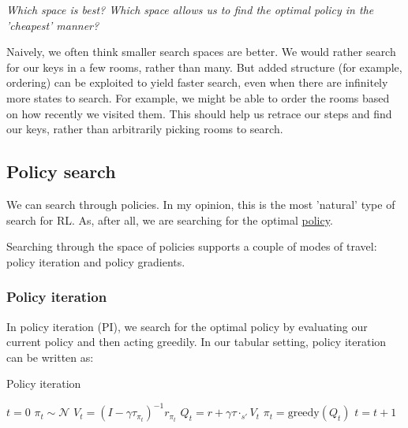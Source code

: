 \begin{displayquote}
  \textsl{Which space is best? Which space allows us to find the optimal policy in the 'cheapest' manner?}
\end{displayquote}

Naively, we often think smaller search spaces are better. We would rather
search for our keys in a few rooms, rather than many. But added
structure (for example, ordering) can be exploited to yield faster
search, even when there are infinitely more states to search. For example,
we might be able to order the rooms based on how recently we visited them.
This should help us retrace our steps and find our keys, rather than arbitrarily
picking rooms to search.

\subsection{Policy search}

We can search through policies. In my opinion, this is the most 'natural' type of search for RL.
As, after all, we are searching for the optimal \underline{policy}.

Searching through the space of policies supports a couple of modes of travel:
policy iteration and policy gradients.

\subsubsection{Policy iteration}

In policy iteration (PI), we search for the optimal policy by evaluating our current
policy and then acting greedily. In our tabular setting, policy iteration can be written as:

\begin{algorithm}[H]
\caption{Policy iteration}
\begin{algorithmic}[1]

    \State $t=0$
    \State $\pi_t \sim \mathcal N$  
      \State $V_t = (I-\gamma \tau_{\pi_t})^{-1} r_{\pi_t}$ 
      \State $Q_t =  r + \gamma \tau\cdot_{s'} V_t$ 
      \State $\pi_t = \text{greedy}(Q_t) $ 
      \State $t = t + 1$
    \EndWhile
    \State {}
\EndProcedure

\end{algorithmic}
\end{algorithm}

